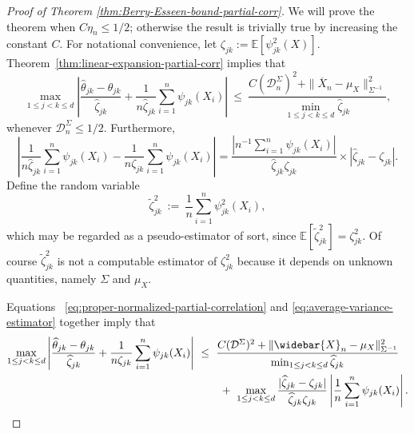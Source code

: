 \documentclass[11pt]{article}
\begin{document}
\begin{appendices}
\begin{proof}[Proof of Theorem \ref{thm:Berry-Esseen-bound-partial-corr}]
We will prove the theorem when $C\eta_n \le 1/2$; otherwise the result is trivially true by increasing the constant $C$. For notational convenience, let $\zeta_{jk} := \mathbb{E}[\psi_{jk}^2(X)]$. Theorem~\ref{thm:linear-expansion-partial-corr} implies that
\begin{equation}\label{eq:proper-normalized-partial-correlation}
\max_{1\le j < k\le d}\left|\frac{\widehat{\theta}_{jk} - \theta_{jk}}{\widehat{\zeta}_{jk}} + \frac{1}{n\widehat{\zeta}_{jk}}\sum_{i=1}^n \psi_{jk}(X_i)\right| ~\le~ \frac{C(\mathcal{D}_n^{\Sigma})^2 + \|\overline{X}_n - \mu_X\|_{\Sigma^{-1}}^2}{\min_{1\le j < k\le d}\widehat{\zeta}_{jk}},
\end{equation}
whenever $\mathcal{D}_n^{\Sigma} \le 1/2$. Furthermore,
\begin{equation}\label{eq:average-variance-estimator}
\left|\frac{1}{n\widehat{\zeta}_{jk}}\sum_{i=1}^n \psi_{jk}(X_i) - \frac{1}{n\zeta_{jk}}\sum_{i=1}^n \psi_{jk}(X_i)\right| = \frac{|n^{-1}\sum_{i=1}^n \psi_{jk}(X_i)|}{\widehat{\zeta}_{jk}\zeta_{jk}}\times|\widehat{\zeta}_{jk} - \zeta_{jk}|.
\end{equation}
Define the random variable
\[
\widetilde{\zeta}_{jk}^2 ~:=~ \frac{1}{n}\sum_{i=1}^n \psi_{jk}^2(X_i),
\]
which may be regarded as a pseudo-estimator of sort, since $\mathbb{E}[\widetilde{\zeta}_{jk}^2] = \zeta^2_{jk}$. Of course $\widetilde{\zeta}_{jk}^2$ is not a computable  estimator of $\zeta^2_{jk}$ because it depends on unknown quantities, namely $\Sigma$ and $\mu_X$.


Equations ~\eqref{eq:proper-normalized-partial-correlation} and \eqref{eq:average-variance-estimator} together imply that
\begin{equation}\label{eq:combination-influence-fn-exp-partial-correlation}
\begin{split}
\max_{1\le j < k\le d}\left|\frac{\widehat{\theta}_{jk} - \theta_{jk}}{\widehat{\zeta}_{jk}} + \frac{1}{n\zeta_{jk}}\sum_{i=1}^n \psi_{jk}(X_i)\right| ~&\le~ \frac{C(\mathcal{D}^{\Sigma})^2 + \|\widebar{X}_n - \mu_X\|_{\Sigma^{-1}}^2}{\min_{1\le j < k\le d}\widehat{\zeta}_{jk}}\\
~&\qquad+~ \max_{1\le j < k\le d}\frac{|\widehat{\zeta}_{jk} - \zeta_{jk}|}{\widehat{\zeta}_{jk}\zeta_{jk}}\left|\frac{1}{n}\sum_{i=1}^n \psi_{jk}(X_i)\right|. 
\end{split}
\end{equation}





\end{proof}
\end{appendices}
\end{document}
